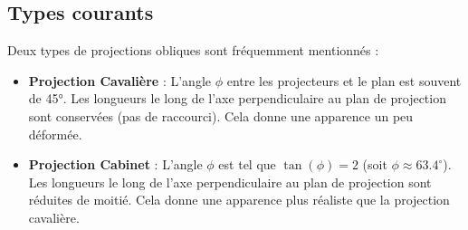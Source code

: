 \subsection{Types courants}
Deux types de projections obliques sont fréquemment mentionnés :
\begin{itemize}
    \item \textbf{Projection Cavalière} : L'angle \( \phi \) entre les projecteurs et le plan est souvent de 45°. Les longueurs le long de l'axe perpendiculaire au plan de projection sont conservées (pas de raccourci). Cela donne une apparence un peu déformée.
    \item \textbf{Projection Cabinet} : L'angle \( \phi \) est tel que \( \tan(\phi) = 2 \) (soit \( \phi \approx 63.4^\circ \)). Les longueurs le long de l'axe perpendiculaire au plan de projection sont réduites de moitié. Cela donne une apparence plus réaliste que la projection cavalière.
\end{itemize}
